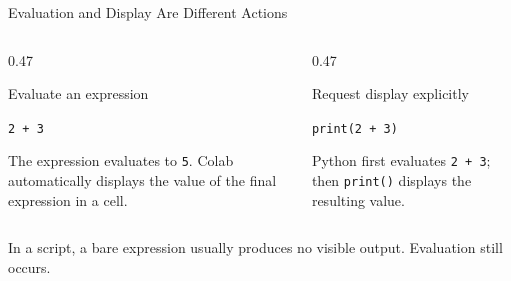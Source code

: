 \documentclass[aspectratio=169,10pt]{beamer}
\begin{document}
\begin{frame}{Evaluation and Display Are Different Actions}

  \begin{columns}[T,onlytextwidth]

    \begin{column}{0.47\textwidth}

      \begin{block}{Evaluate an expression}

        \begin{center}
          \texttt{2 + 3}
        \end{center}

        The expression evaluates to \texttt{5}. Colab automatically displays the value of the final expression in a cell.

      \end{block}

    \end{column}

    \begin{column}{0.47\textwidth}

      \begin{block}{Request display explicitly}

        \begin{center}
          \texttt{print(2 + 3)}
        \end{center}

        Python first evaluates \texttt{2 + 3}; then \texttt{print()} displays the resulting value.

      \end{block}

    \end{column}

  \end{columns}

  \begin{exampleblockcp}

    In a script, a bare expression usually produces no visible output. Evaluation still occurs.

  \end{exampleblockcp}

\end{frame}
\end{document}
